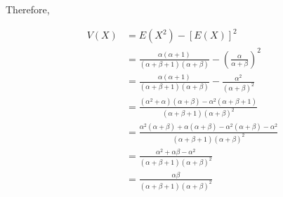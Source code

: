 \begin{theorem}
    Therefore,

    \begin{align*}
        V(X) &= E(X^2) - [E(X)]^2 \\
        &= \frac{\alpha(\alpha + 1)}{(\alpha + \beta + 1)(\alpha + \beta)} - {\left(\frac{\alpha}{\alpha + \beta}\right)}^2 \\
        &= \frac{\alpha(\alpha + 1)}{(\alpha + \beta + 1)(\alpha + \beta)} - \frac{\alpha^2}{(\alpha + \beta)^2}\\
        &= \frac{ (\alpha^2 + \alpha)(\alpha + \beta) - \alpha^2(\alpha + \beta + 1)}{(\alpha + \beta + 1)(\alpha + \beta)^2} \\
        &=  \frac{\alpha^2(\alpha + \beta) + \alpha(\alpha + \beta) - \alpha^2(\alpha + \beta) - \alpha^2}{(\alpha + \beta + 1)(\alpha + \beta)^2} \\
        &= \frac{\alpha^2 + \alpha\beta - \alpha^2}{(\alpha + \beta + 1)(\alpha + \beta)^2} \\
        &= \frac{\alpha\beta}{(\alpha + \beta + 1)(\alpha + \beta)^2}
    \end{align*}

\end{theorem}